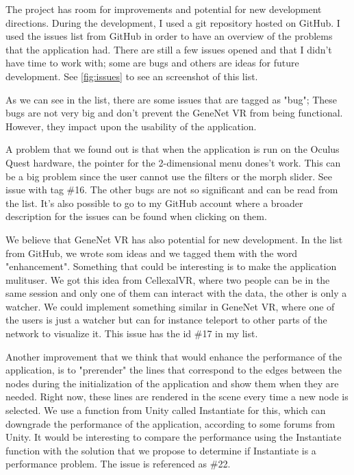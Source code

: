 The project has room for improvements and potential for new development directions. During the development, I used a git repository hosted on GitHub. I used the issues list from GitHub in order to have an overview of the problems that the application had. There are still a few issues opened and that I didn't have time to work with; some are bugs and others are ideas for future development. See \ref{fig:issues} to see an screenshot of this list.


As we can see in the list, there are some issues that are tagged as "bug"; These bugs are not very big and don't prevent the GeneNet VR from being functional. However, they impact upon the usability of the application.

A problem that we found out is that when the application is run on the Oculus Quest hardware, the pointer for the 2-dimensional menu dones't work. This can be a big problem since the user cannot use the filters or the morph slider. See issue with tag \#16. The other bugs are not so significant and can be read from the list. It's also possible to go to my GitHub account where a broader description for the issues can be found when clicking on them.

We believe that GeneNet VR has also potential for new development. In the list from GitHub, we wrote som ideas and we tagged them with the word "enhancement". Something that could be interesting is to make the application mulituser. We got this idea from CellexalVR\cite{cellexalvr}, where two people can be in the same session and only one of them can interact with the data, the other is only a watcher. We could implement something similar in GeneNet VR, where one of the users is just a watcher but can for instance teleport to other parts of the network to visualize it. This issue has the id \#17 in my list.

Another improvement that we think that would enhance the performance of the application, is to "prerender" the lines that correspond to the edges between the nodes during the initialization of the application and show them when they are needed. Right now, these lines are rendered in the scene every time a new node is selected. We use a function from Unity called Instantiate for this, which can downgrade the performance of the application, according to some forums from Unity.
It would be interesting to compare the performance using the Instantiate function with the solution that we propose to determine if Instantiate is a performance problem. The issue is referenced as \#22.


